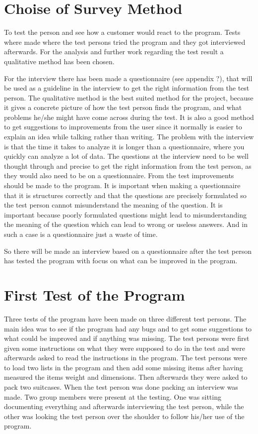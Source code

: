 \section{Choise of Survey Method}
To test the person and see how a customer would react to the program. Tests where made where the test persons tried the program and they got interviewed afterwards. For the analysis and further work regarding the test result a qualitative method has been chosen.

For the interview there has been made a questionnaire (see appendix ?), that will be used as a guideline in the interview to get the right information from the test person. The qualitative method is the best suited method for the project, because it gives a concrete picture of how the test person finds the program, and what problems he/she might have come across during the test. It is also a good method to get suggestions to improvements from the user since it normally is easier to explain an idea while talking rather than writing. The problem with the interview is that the time it takes to analyze it is longer than a questionnaire, where you quickly can analyze a lot of data. The questions at the interview need to be well thought through and precise to get the right information from the test person, as they would also need to be on a questionnaire. From the test improvements should be made to the program. 
It is important when making a questionnaire that it is structures correctly and that the questions are precisely formulated so the test person cannot misunderstand the meaning of the question. It is important because poorly formulated questions might lead to misunderstanding the meaning of the question which can lead to wrong or useless answers. And in such a case is a questionnaire just a waste of time.

So there will be made an interview based on a questionnaire after the test person has tested the program with focus on what can be improved in the program.

\section{First Test of the Program}
Three tests of the program have been made on three different test persons. The main idea was to see if the program had any bugs and to get some suggestions to what could be improved and if anything was missing. The test persons were first given some instructions on what they were supposed to do in the test and were afterwards asked to read the instructions in the program. The test persons were to load two lists in the program and then add some missing items after having measured the items weight and dimensions. Then afterwards they were asked to pack two suitcases. When the test person was done packing an interview was made. Two group members were present at the testing. One was sitting documenting everything and afterwards interviewing the test person, while the other was looking the test person over the shoulder to follow his/her use of the program.

